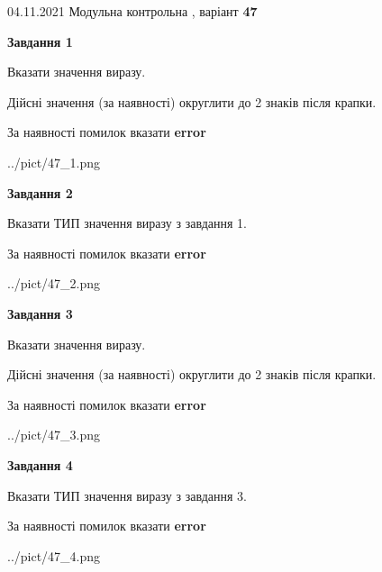 \documentclass[11pt, ukrainian]{article}
\begin{document}
{04.11.2021 Модульна контрольна , варіант  \No \textbf { 47 }\par}
{
\begin {large}
{\begin {center}\textbf{Завдання 1}\end {center}}\par
Вказати значення виразу. \par
Дійсні значення (за наявності) округлити до 2 знаків після крапки. \par
За наявності помилок вказати \textbf{error}

\begin{center}
	{../pict/47_1.png}
\end{center}
\newpage

{\begin {center}\textbf{Завдання 2}\end {center}}\par
Вказати ТИП значення виразу з завдання 1. \par
За наявності помилок вказати \textbf{error}

\begin{center}
	{../pict/47_2.png}
\end{center}
\newpage

{\begin {center}\textbf{Завдання 3}\end {center}}\par
Вказати значення виразу. \par
Дійсні значення (за наявності) округлити до 2 знаків після крапки. \par
За наявності помилок вказати \textbf{error}

\begin{center}
	{../pict/47_3.png}
\end{center}
\newpage

{\begin {center}\textbf{Завдання 4}\end {center}}\par
Вказати ТИП значення виразу з завдання 3. \par
За наявності помилок вказати \textbf{error}

\begin{center}
	{../pict/47_4.png}
\end{center}
\newpage


\end{large}}
\end{document}
